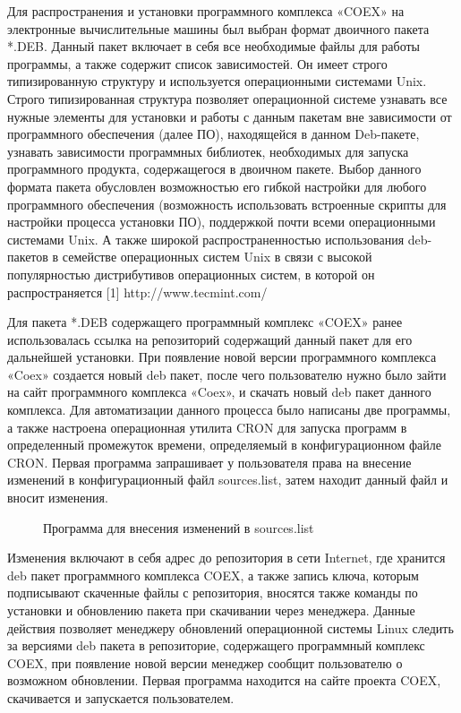 Для распространения и установки программного комплекса «COEX» на электронные вычислительные машины был выбран формат двоичного пакета *.DEB. Данный пакет включает в себя все необходимые файлы для работы программы, а также содержит список зависимостей. Он имеет строго типизированную структуру и используется операционными системами Unix. Строго типизированная структура позволяет операционной системе узнавать все нужные элементы для установки и работы с данным пакетам вне зависимости от программного обеспечения (далее ПО), находящейся в данном Deb-пакете, узнавать зависимости программных библиотек, необходимых для запуска программного продукта, содержащегося в двоичном пакете.  Выбор данного формата пакета обусловлен возможностью его гибкой настройки для любого программного обеспечения (возможность использовать встроенные скрипты для настройки процесса установки ПО), поддержкой почти всеми операционными системами Unix. А также широкой распространенностью использования deb-пакетов в семействе операционных систем Unix в связи с высокой популярностью дистрибутивов операционных систем, в которой он распространяется [1] http://www.tecmint.com/

Для пакета *.DEB содержащего программный комплекс «COEX» ранее использовалась ссылка на репозиторий содержащий данный пакет для его дальнейшей установки. При появление новой версии программного комплекса «Coex» создается новый deb пакет, после чего пользователю нужно было зайти на сайт программного комплекса «Coex», и скачать новый deb пакет данного комплекса. Для автоматизации данного процесса было написаны две программы, а также настроена операционная утилита CRON для запуска программ в определенный промежуток времени, определяемый в конфигурационном файле CRON. Первая программа запрашивает у пользователя права на внесение изменений в конфигурационный файл sources.list, затем находит данный файл и вносит изменения. 

\begin{figure}[!ht]
\caption{ Программа для внесения изменений в sources.list }
\label{ser_1:ser_1}
\end{figure}

Изменения включают в себя адрес до репозитория   в сети Internet, где хранится deb пакет программного комплекса COEX, а также запись ключа, которым подписывают скаченные файлы с репозитория, вносятся также команды по установки и обновлению пакета при скачивании через менеджера. Данные действия позволяет менеджеру обновлений операционной системы Linux следить за версиями deb пакета в репозиторие, содержащего программный комплекс COEX, при появление новой версии менеджер сообщит пользователю о возможном обновлении. Первая программа находится на сайте проекта COEX, скачивается и запускается пользователем. 


